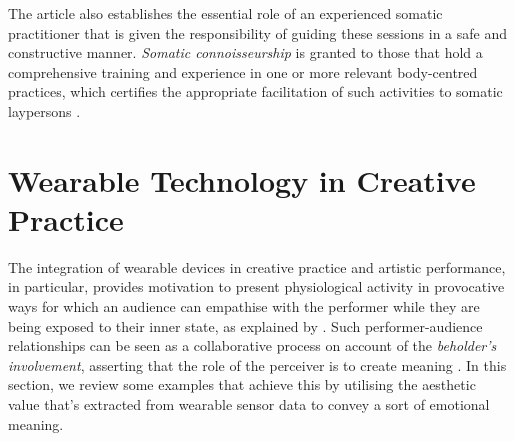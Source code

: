The article also establishes the essential role of an experienced somatic practitioner that is given the responsibility of guiding these sessions in a safe and constructive manner. \textit{Somatic connoisseurship} is granted to those that hold a comprehensive training and experience in one or more relevant body-centred practices, which certifies the appropriate facilitation of such activities to somatic laypersons \cite{samaritter_aesthetic_2018}.



\section{Wearable Technology in Creative Practice}%
\label{lit_review:biosignals_creativity}

The integration of wearable devices in creative practice and artistic performance, in particular, provides motivation to present physiological activity in provocative ways for which an audience can empathise with the performer while they are being exposed to their inner state, as explained by \citeauthor{francoise_designing_2017} \cite{francoise_designing_2017}. Such performer-audience relationships can be seen as a collaborative process on account of the \textit{beholder's involvement}, asserting that the role of the perceiver is to create meaning \cite{kandel_age_2012}. In this section, we review some examples that achieve this by utilising the aesthetic value that's extracted from wearable sensor data to convey a sort of emotional meaning.

